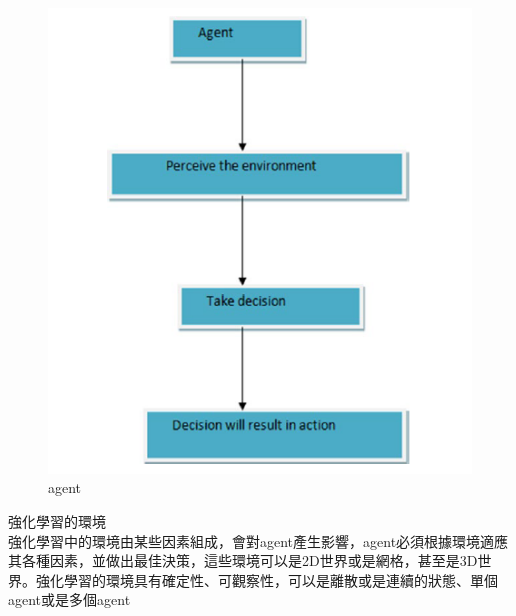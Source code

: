 \documentclass[14pt,a4paper]{report}  %
\begin{document}
\begin{figure}[hbt!]
\begin{center}
\includegraphics[scale=0.74]{agent}
\caption{agent}%
\end{center}
\end{figure}
強化學習的環境\\
\qquad 強化學習中的環境由某些因素組成，會對agent產生影響，agent必須根據環境適應其各種因素，並做出最佳決策，這些環境可以是2D世界或是網格，甚至是3D世界。強化學習的環境具有確定性、可觀察性，可以是離散或是連續的狀態、單個agent或是多個agent\\
\end{document}
